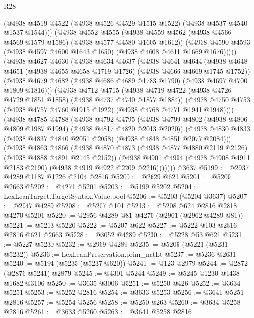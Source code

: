 \begin{lexlean}{R28}
\begin{coremodule}
              (@4938 @4519 @4522 (@4938 @4526 @4529 @1515 @1522) (@4938 @4537 @4540 @1537 @1544)))
            (@4938
              @4552
              @4555
              (@4938 @4559 @4562 (@4938 @4566 @4569 @1579 @1586) (@4938 @4577 @4580 @1605 @1612))
              (@4938 @4590 @4593 (@4938 @4597 @4600 @1643 @1650) (@4938 @4608 @4611 @1669 @1676)))))
        (@4938
          @4627
          @4630
          (@4938
            @4634
            @4637
            (@4938
              @4641
              @4644
              (@4938 @4648 @4651 (@4938 @4655 @4658 @1719 @1726) (@4938 @4666 @4669 @1745 @1752))
              (@4938 @4679 @4682 (@4938 @4686 @4689 @1783 @1790) (@4938 @4697 @4700 @1809 @1816)))
            (@4938
              @4712
              @4715
              (@4938 @4719 @4722 (@4938 @4726 @4729 @1851 @1858) (@4938 @4737 @4740 @1877 @1884))
              (@4938 @4750 @4753 (@4938 @4757 @4760 @1915 @1922) (@4938 @4768 @4771 @1941 @1948))))
          (@4938
            @4785
            @4788
            (@4938
              @4792
              @4795
              (@4938 @4799 @4802 (@4938 @4806 @4809 @1987 @1994) (@4938 @4817 @4820 @2013 @2020))
              (@4938 @4830 @4833 (@4938 @4837 @4840 @2051 @2058) (@4938 @4848 @4851 @2077 @2084)))
            (@4938
              @4863
              @4866
              (@4938 @4870 @4873 (@4938 @4877 @4880 @2119 @2126) (@4938 @4888 @4891 @2145 @2152))
              (@4938
                @4901
                @4904
                (@4938 @4908 @4911 @2183 @2190)
                (@4938 @4919 @4922 @2209 @2216)))))))
    @3637
@5199 := @2937 @4289 @1187 @1226 @3104 @2816
@5200 := @2629 @621
@5201 := @5200 @2663
@5202 := @4271 @5201
@5203 := @5199 @5202
@5204 := LexLeanTarget.TargetSyntax.Value.bool
@5206 := @5203 (@5204 @3637)
@5207 := @2947 @4289
@5208 := @5207 @101
@5213 := @5208 @624 @2816 @2818 @4270 @5201
@5220 := @2956 @4289 @81 @4270 (@2961 (@2962 @4289 @81))
@5221 := @5213 @5220
@5222 := @5207 @622
@5227 := @5222 @103 @2816 @2816 @621 @2663
@5228 := @3052 @4289
@5230 := @5228 @53 @621
@5231 := @5227 @5230
@5232 := @2969 @4289
@5235 := @5206 (@5221 (@5231 @5232))
@5236 := LexLeanPreservation.prim_natLt
@5237 := @5236 @2631
@5240 := @5194 (@5235 (@5237 @620))
@5241 := @123 @2979
@5244 := @2872 (@2876 @5241) @2879
@5245 := @4301 @5244
@5249 := @5245 @1230 @1438 @1682 @3106
@5250 := @3635 @3006
@5251 := @5250 @426
@5252 := @3634 @5251
@5253 := @5252 @2816
@5254 := @3633 @5253
@5256 := @3641 @5251 @2816
@5257 := @5254 @5256
@5258 := @5250 @263
@5260 := @3634 @5258 @2816
@5261 := @3633 @5260
@5263 := @3641 @5258 @2816

\end{coremodule}
\end{lexlean}
